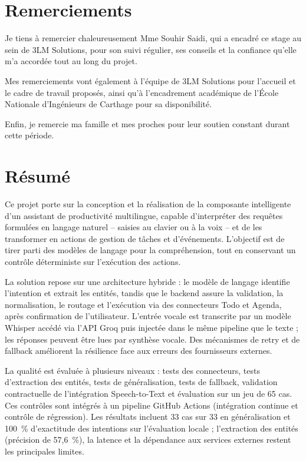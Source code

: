 \documentclass[11pt,a4paper,openany,oneside]{report}
\begin{document}
\setcounter{page}{1}

\chapter*{Remerciements}
Je tiens \`a remercier chaleureusement Mme Souhir Saidi, qui a encadr\'e ce stage au sein de 3LM Solutions, pour son suivi r\'egulier, ses conseils et la confiance qu'elle m'a accord\'ee tout au long du projet.

Mes remerciements vont \'egalement \`a l'\'equipe de 3LM Solutions pour l'accueil et le cadre de travail propos\'es, ainsi qu'\`a l'encadrement acad\'emique de l'\'Ecole Nationale d'Ing\'enieurs de Carthage pour sa disponibilit\'e.

Enfin, je remercie ma famille et mes proches pour leur soutien constant durant cette p\'eriode.

\chapter*{R\'esum\'e}
Ce projet porte sur la conception et la r\'ealisation de la composante intelligente d'un assistant de productivit\'e multilingue, capable d'interpr\'eter des requ\^etes formul\'ees en langage naturel -- saisies au clavier ou \`a la voix -- et de les transformer en actions de gestion de t\^aches et d'\'ev\'enements. L'objectif est de tirer parti des mod\`eles de langage pour la compr\'ehension, tout en conservant un contr\^ole d\'eterministe sur l'ex\'ecution des actions.

La solution repose sur une architecture hybride : le mod\`ele de langage identifie l'intention et extrait les entit\'es, tandis que le backend assure la validation, la normalisation, le routage et l'ex\'ecution via des connecteurs Todo et Agenda, apr\`es confirmation de l'utilisateur. L'entr\'ee vocale est transcrite par un mod\`ele Whisper acc\'ed\'e via l'API Groq puis inject\'ee dans le m\^eme pipeline que le texte ; les r\'eponses peuvent \^etre lues par synth\`ese vocale. Des m\'ecanismes de retry et de fallback am\'eliorent la r\'esilience face aux erreurs des fournisseurs externes.

La qualit\'e est \'evalu\'ee \`a plusieurs niveaux : tests des connecteurs, tests d'extraction des entit\'es, tests de g\'en\'eralisation, tests de fallback, validation contractuelle de l'int\'egration Speech-to-Text et \'evaluation sur un jeu de 65 cas. Ces contr\^oles sont int\'egr\'es \`a un pipeline GitHub Actions (int\'egration continue et contr\^ole de r\'egression). Les r\'esultats incluent 33 cas sur 33 en g\'en\'eralisation et 100~\% d'exactitude des intentions sur l'\'evaluation locale ; l'extraction des entit\'es (pr\'ecision de 57,6~\%), la latence et la d\'ependance aux services externes restent les principales limites.
\end{document}
